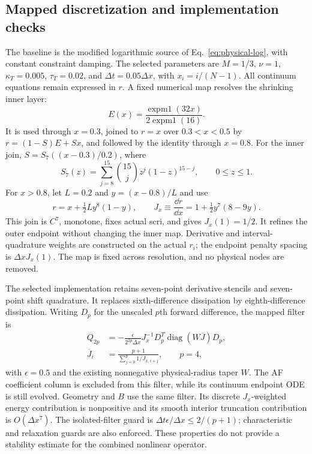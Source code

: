 \subsection{Mapped discretization and implementation checks}
The baseline is the modified logarithmic source of Eq.~\eqref{eq:physical-log}, with constant constraint damping. The selected parameters are $M=1/3$, $\nu=1$, $\kappa_T=0.005$, $\tau_T=0.02$, and $\Delta t=0.05\Delta x$, with $x_i=i/(N-1)$. All continuum equations remain expressed in $r$. A fixed numerical map resolves the shrinking inner layer:
\begin{equation}
 E(x)=\frac{\operatorname{expm1}(32x)}{2\operatorname{expm1}(16)}.
\end{equation}
It is used through $x=0.3$, joined to $r=x$ over $0.3<x<0.5$ by $r=(1-S)E+Sx$, and followed by the identity through $x=0.8$. For the inner join, $S=S_7((x-0.3)/0.2)$, where
\begin{equation}
 S_7(z)=\sum_{j=8}^{15}\binom{15}{j}z^j(1-z)^{15-j},
 \qquad 0\leq z\leq1.
\end{equation}
For $x>0.8$, let $L=0.2$ and $y=(x-0.8)/L$ and use
\begin{equation}
 r=x+\tfrac12Ly^8(1-y),\qquad
 J_x\equiv\frac{\dd r}{\dd x}=1+\tfrac12y^7(8-9y).
\end{equation}
This join is $C^7$, monotone, fixes actual scri, and gives $J_x(1)=1/2$. It refines the outer endpoint without changing the inner map. Derivative and interval-quadrature weights are constructed on the actual $r_i$; the endpoint penalty spacing is $\Delta xJ_x(1)$. The map is fixed across resolution, and no physical nodes are removed.

The selected implementation retains seven-point derivative stencils and seven-point shift quadrature. It replaces sixth-difference dissipation by eighth-difference dissipation. Writing $D_p$ for the unscaled $p$th forward difference, the mapped filter is
\begin{align}
 Q_{2p}&=-\frac{\epsilon}{2^{2p}\Delta x}
 J_x^{-1}D_p^T\operatorname{diag}(W\overline J)D_p,\\
 \overline J_i&=\frac{p+1}{\sum_{j=0}^{p}1/J_{x,i+j}},\qquad p=4,
\end{align}
with $\epsilon=0.5$ and the existing nonnegative physical-radius taper $W$. The AF coefficient column is excluded from this filter, while its continuum endpoint ODE is still evolved. Geometry and $B$ use the same filter. Its discrete $J_x$-weighted energy contribution is nonpositive and its smooth interior truncation contribution is $O(\Delta x^7)$. The isolated-filter guard is $\Delta t\epsilon/\Delta x\leq2/(p+1)$; characteristic and relaxation guards are also enforced. These properties do not provide a stability estimate for the combined nonlinear operator.


